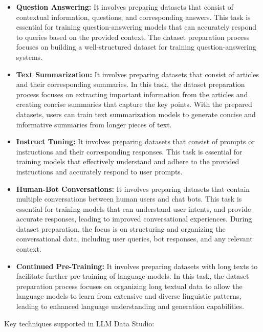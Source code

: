 \documentclass{article}
\begin{document}
\begin{itemize}
    \item \textbf{Question Answering:} It involves preparing datasets that consist of contextual information, questions, and corresponding answers. This task is essential for training question-answering models that can accurately respond to queries based on the provided context. The dataset preparation process focuses on building a well-structured dataset for training question-answering systems.

    \item \textbf{Text Summarization:} It involves preparing datasets that consist of articles and their corresponding summaries. In this task, the dataset preparation process focuses on extracting important information from the articles and creating concise summaries that capture the key points. With the prepared datasets, users can train text summarization models to generate concise and informative summaries from longer pieces of text.

    \item \textbf{Instruct Tuning: }It involves preparing datasets that consist of prompts or instructions and their corresponding responses. This task is essential for training models that effectively understand and adhere to the provided instructions and accurately respond to user prompts.

    \item \textbf{Human-Bot Conversations:} It involves preparing datasets that contain multiple conversations between human users and chat bots. This task is essential for training models that can understand user intents, and provide accurate responses, leading to improved conversational experiences. During dataset preparation, the focus is on structuring and organizing the conversational data, including user queries, bot responses, and any relevant context.

    \item \textbf{Continued Pre-Training:} It involves preparing datasets with long texts to facilitate further pre-training of language models. In this task, the dataset preparation process focuses on organizing long textual data to allow the language models to learn from extensive and diverse linguistic patterns, leading to enhanced language understanding and generation capabilities.
\end{itemize}


Key techniques supported in LLM Data Studio:
\end{document}
